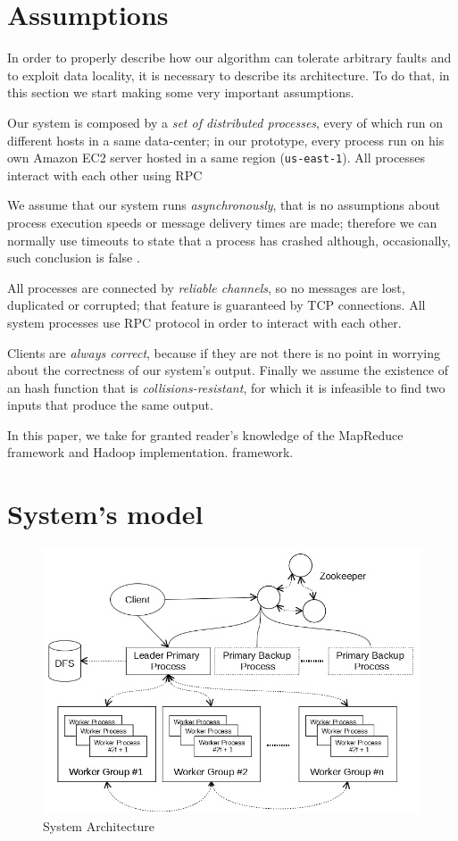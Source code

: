 \documentclass[sigchi]{acmart}
\begin{document}
\section{Assumptions}

In order to properly describe how our algorithm can tolerate arbitrary faults and to exploit data locality, it is necessary to describe its architecture. To do that, in this section we start making some very important assumptions.

Our system is composed by a \textit{set of distributed processes}, every of which run on different hosts in a same data-center; in our prototype, every process run on his own Amazon EC2 server hosted in a same region (\texttt{us-east-1}). All processes interact with each other using RPC

We assume that our system runs \textit{asynchronously}, that is no assumptions about process execution speeds or message delivery times are made; therefore we can normally use timeouts to state that a process has crashed although, occasionally, such conclusion is false \cite{SDCC}.

All processes are connected by \textit{reliable channels}, so no messages are lost, duplicated or corrupted; that feature is guaranteed by TCP connections. All system processes use RPC protocol in order to interact with each other.

Clients are \textit{always correct}, because if they are not there is no point in worrying about the correctness of our system's output. Finally we assume the existence of an hash function that is \textit{collisions-resistant}, for which it is infeasible to find two inputs that produce the same output.

In this paper, we take for granted reader's knowledge of the MapReduce framework and Hadoop implementation. framework.

\section{System's model}

\begin{figure}[h]
  \centering
  \includegraphics[width=\linewidth]{Architecture}
  \caption{System Architecture}
\end{figure}
\end{document}
